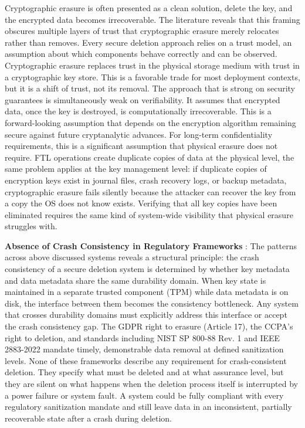 Cryptographic erasure is often presented as a clean solution, delete the key, and the encrypted 
data becomes irrecoverable. The literature reveals that this framing obscures multiple layers of 
trust that cryptographic erasure merely relocates rather than removes. Every secure deletion 
approach relies on a trust model, an assumption about which components behave correctly and can be 
observed. Cryptographic erasure replaces trust in the physical storage medium with trust in a 
cryptographic key store. This is a favorable trade for most deployment contexts, but it is a shift 
of trust, not its removal. The approach that is strong on security guarantees is simultaneously 
weak on verifiability. It assumes that encrypted data, once the key is destroyed, is 
computationally irrecoverable. This is a forward-looking assumption that depends on the encryption 
algorithm remaining secure against future cryptanalytic advances. For long-term confidentiality 
requirements, this is a significant assumption that physical erasure does not require. FTL 
operations create duplicate copies of data at the physical level, the same problem applies at the 
key management level: if duplicate copies of encryption keys exist in journal files, crash 
recovery logs, or backup metadata, cryptographic erasure fails silently because the attacker can 
recover the key from a copy the OS does not know exists. Verifying that all key copies have been 
eliminated requires the same kind of system-wide visibility that physical erasure struggles with.

\textbf{Absence of Crash Consistency in Regulatory Frameworks} :
The patterns across above discussed systems reveals a structural principle: the crash consistency 
of a secure deletion system is determined by whether key metadata and data metadata share the same 
durability domain. When key state is maintained in a separate trusted component (TPM) while data 
metadata is on disk, the interface between them becomes the consistency bottleneck. Any system that 
crosses durability domains must explicitly address this interface or accept the crash consistency 
gap. The GDPR right to erasure (Article 17), the CCPA's right to deletion, and standards including 
NIST SP 800-88 Rev. 1 and IEEE 2883-2022 mandate timely, demonstrable data removal at defined 
sanitization levels. None of these frameworks describe any requirement for crash-consistent 
deletion. They specify what must be deleted and at what assurance level, but they are silent on 
what happens when the deletion process itself is interrupted by a power failure or system fault. A 
system could be fully compliant with every regulatory sanitization mandate and still leave data in 
an inconsistent, partially recoverable state after a crash during deletion. 

